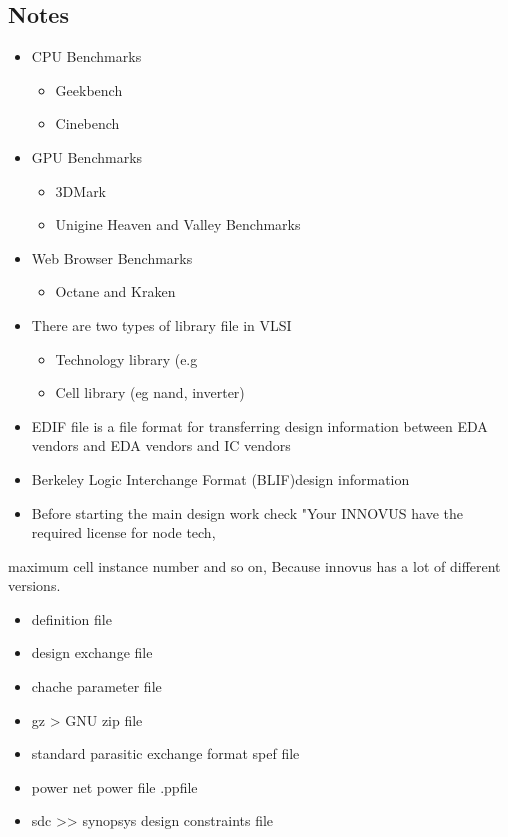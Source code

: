 \documentclass[a4paper]{article}
\begin{document}
\subsection{Notes}
\label{sec:org4c54750}
\begin{itemize}
\item CPU Benchmarks
\begin{itemize}
\item Geekbench
\item Cinebench
\end{itemize}
\item GPU Benchmarks
\begin{itemize}
\item 3DMark
\item Unigine Heaven and Valley Benchmarks
\end{itemize}
\item Web Browser Benchmarks
\begin{itemize}
\item Octane and Kraken
\end{itemize}

\item There are two types of library file in VLSI
\begin{itemize}
\item Technology library (e.g
\item Cell library (eg nand, inverter)
\end{itemize}

\item EDIF file is a file format for transferring
design information between EDA vendors and EDA vendors and IC vendors
\item Berkeley Logic Interchange Format (BLIF)design information

\item Before starting the main design work check "Your INNOVUS have the required license for node tech,
\end{itemize}
maximum cell instance number and so on, Because innovus has a lot of different versions.

\begin{itemize}
\item definition file
\item design exchange file
\item chache parameter file
\item gz > GNU zip file
\item standard parasitic exchange format  spef file
\item power net power file  .ppfile
\item sdc >> synopsys design constraints file
\end{itemize}
\end{document}

